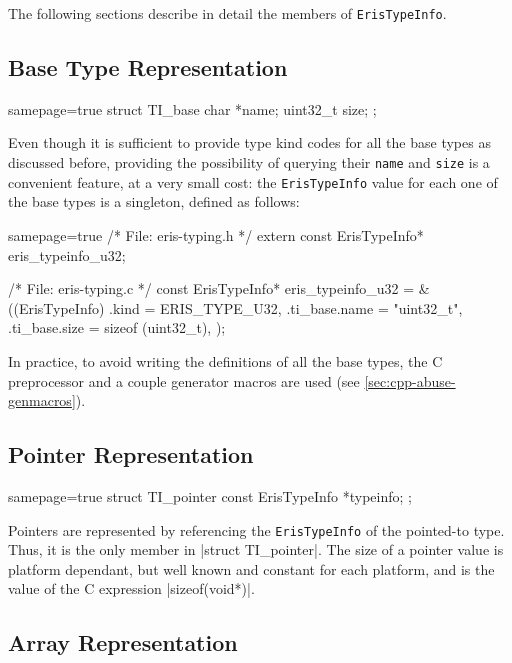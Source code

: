 \noindent
The following sections describe in detail the members of \verb|ErisTypeInfo|.


\subsection{Base Type Representation}

\begin{ccode*}{samepage=true}
  struct TI_base {
    char               *name;
    uint32_t            size;
  };
\end{ccode*}

\noindent
Even though it is sufficient to provide type kind codes for all the base types
as discussed before, providing the possibility of querying their \verb|name|
and \verb|size| is a convenient feature, at a very small cost: the
\verb|ErisTypeInfo| value for each one of the base types is a singleton,
defined as follows:

\begin{ccode*}{samepage=true}
  /* File: eris-typing.h */
  extern const ErisTypeInfo* eris_typeinfo_u32;

  /* File: eris-typing.c */
  const ErisTypeInfo* eris_typeinfo_u32 = &((ErisTypeInfo) {
    .kind         = ERIS_TYPE_U32,
    .ti_base.name = "uint32_t",
    .ti_base.size = sizeof (uint32_t),
  });
\end{ccode*}

\noindent In practice, to avoid writing the definitions of all the base types,
the C preprocessor and a couple generator macros are used (see
\autoref{sec:cpp-abuse-genmacros}).


\subsection{Pointer Representation}
  \label{sec:pointer-typeinfo}

\begin{ccode*}{samepage=true}
  struct TI_pointer {
    const ErisTypeInfo *typeinfo;
  };
\end{ccode*}

\noindent
Pointers are represented by referencing the \verb|ErisTypeInfo| of the
pointed-to type. Thus, it is the only member in \Mc|struct TI_pointer|. The
size of a pointer value is platform dependant, but well known and constant for
each platform, and is the value of the C expression \Mc|sizeof(void*)|.


\subsection{Array Representation}


